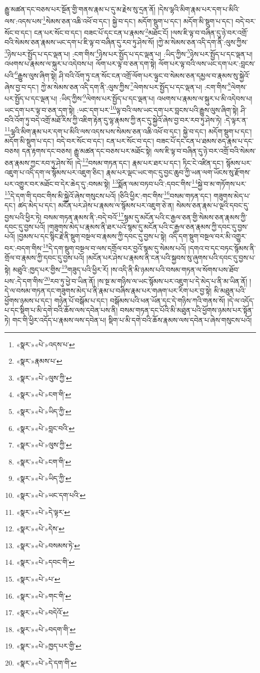 རྒྱུ་མཚན་དང་བཅས་པར་སྔོན་གྱི་གནས་རྣམ་པ་དུ་མ་རྗེས་སུ་དྲན་ནོ། །དེས་ལྷའི་མིག་རྣམ་པར་དག་པ་མིའི་ལས་:འདས་པས་\footnote{«སྣར་»«པེ་»འདས་པ་}སེམས་ཅན་འཆི་འཕོ་བ་དང་། སྐྱེ་བ་དང་། མདོག་སྡུག་པ་དང་། མདོག་མི་སྡུག་པ་དང་། བདེ་བར་སོང་བ་དང་། ངན་པར་སོང་བ་དང་། བཟང་པོ་དང་ངན་པ་རྣམས་\footnote{«སྣར་»རྣམས་པ་}མཐོང་ངོ། །ལས་ཇི་ལྟ་བ་བཞིན་དུ་ཉེ་བར་འགྲོ་བའི་སེམས་ཅན་རྣམས་ཡང་དག་པ་ཇི་ལྟ་བ་བཞིན་དུ་རབ་ཏུ་ཤེས་སོ། །ཀྱེ་མ་སེམས་ཅན་འདི་དག་ནི་:ལུས་ཀྱིས་\footnote{«སྣར་»«པེ་»ལུས་ཀྱི་}ཉེས་པར་སྤྱོད་པ་དང་ལྡན་པ། :ངག་གིས་\footnote{«སྣར་»«པེ་»ངག་གི་}ཉེས་པར་སྤྱོད་པ་དང་ལྡན་པ། :ཡིད་ཀྱིས་\footnote{«སྣར་»«པེ་»ཡིད་ཀྱི་}ཉེས་པར་སྤྱོད་པ་དང་ལྡན་པ། འཕགས་པ་རྣམས་ལ་སྐུར་པ་འདེབས་པ། ལོག་པར་ལྟ་བ་ཅན་དག་སྟེ། ལོག་པར་ལྟ་བའི་ལས་ཡང་དག་པར་:བླངས་པའི་\footnote{«སྣར་»«པེ་»བླང་བའི་}རྒྱུས་ལུས་ཞིག་སྟེ། ཤི་བའི་འོག་ཏུ་ངན་སོང་ངན་འགྲོ་ལོག་པར་ལྟུང་བ་སེམས་ཅན་དམྱལ་བ་རྣམས་སུ་སྐྱེའོ་ཞེས་བྱ་བ་དང་། ཀྱེ་མ་སེམས་ཅན་འདི་དག་ནི་:ལུས་ཀྱིས་\footnote{«སྣར་»«པེ་»ལུས་ཀྱི་}ལེགས་པར་སྤྱོད་པ་དང་ལྡན་པ། :ངག་གིས་\footnote{«སྣར་»«པེ་»ངག་གི་}ལེགས་པར་སྤྱོད་པ་དང་ལྡན་པ། :ཡིད་ཀྱིས་\footnote{«སྣར་»«པེ་»ཡིད་ཀྱི་}ལེགས་པར་སྤྱོད་པ་དང་ལྡན་པ། འཕགས་པ་རྣམས་ལ་སྐུར་པ་མི་འདེབས་པ། ཡང་དག་པར་ལྟ་བ་ཅན་དག་སྟེ། :ཡང་དག་པར་\footnote{«སྣར་»«པེ་»ཡང་དག་པའི་}ལྟ་བའི་ལས་ཡང་དག་པར་བླངས་པའི་རྒྱུས་ལུས་ཞིག་སྟེ། ཤི་བའི་འོག་ཏུ་བདེ་འགྲོ་མཐོ་རིས་ཀྱི་འཇིག་རྟེན་དུ་ལྷ་རྣམས་ཀྱི་ནང་དུ་སྐྱེའོ་ཞེས་བྱ་བར་རབ་ཏུ་ཤེས་ཏེ། :དེ་ལྟར་ན་\footnote{«སྣར་»«པེ་»དེ་ལྟར་}ལྷའི་མིག་རྣམ་པར་དག་པ་མིའི་ལས་འདས་པས་སེམས་ཅན་འཆི་འཕོ་བ་དང་། སྐྱེ་བ་དང་། མདོག་སྡུག་པ་དང་། མདོག་མི་སྡུག་པ་དང་། བདེ་བར་སོང་བ་དང་། ངན་པར་སོང་བ་དང་། བཟང་པོ་དང་ངན་པ་ཐམས་ཅད་རྣམ་པ་དང་བཅས། དན་རྟགས་དང་བཅས། རྒྱུ་མཚན་དང་བཅས་པར་མཐོང་སྟེ། ལས་ཇི་ལྟ་བ་བཞིན་དུ་ཉེ་བར་འགྲོ་བའི་སེམས་ཅན་རྣམས་ཀྱང་རབ་ཏུ་ཤེས་སོ། །དེ་\footnote{«སྣར་»«པེ་»དེས་}བསམ་གཏན་དང་། རྣམ་པར་ཐར་པ་དང་། ཏིང་ངེ་འཛིན་དང་། སྙོམས་པར་འཇུག་པ་འདི་དག་ལ་སྙོམས་པར་འཇུག་ཅིང་། རྣམ་པར་ལྡང་ཡང་གང་དུ་བྱང་ཆུབ་ཀྱི་ཡན་ལག་ཡོངས་སུ་རྫོགས་པར་འགྱུར་བར་མཐོང་བ་དེར་ཆེད་དུ་:བསམ་སྟེ། \footnote{«སྣར་»«པེ་»བསམས་ཏེ་}སྨོན་ལམ་བཏབ་པའི་:དབང་གིས་\footnote{«སྣར་»«པེ་»དབང་གི་}སྐྱེ་བ་མ་གཏོགས་པར་\footnote{«སྣར་»«པེ་»པ་}དེ་དག་གི་དབང་གིས་མི་སྐྱེའོ་ཞེས་གསུངས་པའོ། །ཅིའི་ཕྱིར་:གང་གིས་\footnote{«སྣར་»«པེ་»གང་གི་}བསམ་གཏན་དང་། གཟུགས་མེད་པ་དང་། ཚད་མེད་པ་དང་། མངོན་པར་ཤེས་པ་རྣམས་ལ་སྙོམས་པར་འཇུག་ཅེ་ན། སེམས་ཅན་རྣམ་པ་ལྔའི་དབང་དུ་བྱས་པའི་ཕྱིར་ཏེ། བསམ་གཏན་རྣམས་ནི་:བདེ་བའོ་\footnote{«སྣར་»«པེ་»བདེའོ་}སྙམ་དུ་མངོན་པའི་ང་རྒྱལ་ཅན་གྱི་སེམས་ཅན་རྣམས་ཀྱི་དབང་དུ་བྱས་པའོ། །གཟུགས་མེད་པ་རྣམས་ནི་ཐར་པའོ་སྙམ་དུ་མངོན་པའི་ང་རྒྱལ་ཅན་རྣམས་ཀྱི་དབང་དུ་བྱས་པའོ། །བྱམས་པ་དང་སྙིང་རྗེ་ནི་སྡུག་བསྔལ་བ་རྣམས་ཀྱི་དབང་དུ་བྱས་པ་སྟེ། འདི་དག་སྡུག་བསྔལ་བར་མི་འགྱུར་བར་:བདག་གིས་\footnote{«སྣར་»«པེ་»བདག་གི་}དེ་དག་སྡུག་བསྔལ་བ་ལས་དགྲོལ་བར་བྱའོ་སྙམ་དུ་སེམས་པའོ། །དགའ་བ་དང་བཏང་སྙོམས་ནི་གྲོལ་བ་རྣམས་ཀྱི་དབང་དུ་བྱས་པའོ། །མངོན་པར་ཤེས་པ་རྣམས་ནི་ངན་པའི་སྐྱབས་སུ་ཞུགས་པའི་དབང་དུ་བྱས་པ་སྟེ། མཐུའི་:ཁྱད་པར་གྱིས་\footnote{«སྣར་»«པེ་»ཁྱད་པར་གྱི་}གཟུད་པའི་ཕྱིར་རོ། །ས་འདི་ནི་མི་ཉམས་པའི་བསམ་གཏན་ལ་སོགས་པས་ཐོབ་པས་:དེ་དག་གིས་\footnote{«སྣར་»«པེ་»དེ་དག་གི་}རབ་ཏུ་ཕྱེ་བ་ཡིན་ནོ། །ས་སྔ་མ་གཉིས་ལ་ཡང་སྙོམས་པར་འཇུག་པ་དེ་མེད་པ་ནི་མ་ཡིན་ནོ། །དེ་ལ་བསམ་གཏན་དང་གཟུགས་མེད་པ་ནི་རྣམ་པ་བཞིས་རྣམ་པར་གཞག་པར་རིག་པར་བྱ་སྟེ། མི་མཐུན་པའི་ཕྱོགས་ཉམས་པ་དང་། གཉེན་པོ་བསྒོམ་པ་དང་། བསྒོམས་པའི་ཕན་ཡོན་དང་དེ་གཉིས་ཀའི་གནས་སོ། །དེ་ལ་འདོད་པ་དང་སྡིག་པ་མི་དགེ་བའི་ཆོས་ལས་དབེན་པས་ནི། བསམ་གཏན་དང་པོའི་མི་མཐུན་པའི་ཕྱོགས་ཉམས་པར་སྟོན་ཏེ། གང་གི་ཕྱིར་འདོད་པ་རྣམས་ལས་དབེན་པ། སྡིག་པ་མི་དགེ་བའི་ཆོས་རྣམས་ལས་དབེན་པ་ཞེས་གསུངས་པའོ། 